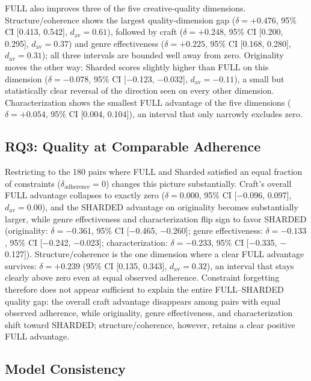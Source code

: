 FULL also improves three of the five creative-quality dimensions. Structure/coherence shows the largest quality-dimension gap ($\delta = +0.476$, 95\% CI [0.413, 0.542], $d_{\mathrm{av}} = 0.61$), followed by craft ($\delta = +0.248$, 95\% CI [0.200, 0.295], $d_{\mathrm{av}} = 0.37$) and genre effectiveness ($\delta = +0.225$, 95\% CI [0.168, 0.280], $d_{\mathrm{av}} = 0.31$); all three intervals are bounded well away from zero. Originality moves the other way: Sharded scores slightly higher than FULL on this dimension ($\delta = -0.078$, 95\% CI [$-$0.123, $-$0.032], $d_{\mathrm{av}} = -0.11$), a small but statistically clear reversal of the direction seen on every other dimension. Characterization shows the smallest FULL advantage of the five dimensions ($\delta = +0.054$, 95\% CI [0.004, 0.104]), an interval that only narrowly excludes zero.

\subsection{RQ3: Quality at Comparable Adherence}
\label{sec:rq3}

Restricting to the 180 pairs where FULL and Sharded satisfied an equal fraction of constraints ($\delta_{\text{adherence}} = 0$) changes this picture substantially. Craft's overall FULL advantage collapses to exactly zero ($\delta = 0.000$, 95\% CI [$-$0.096, 0.097], $d_{\mathrm{av}} = 0.00$), and the SHARDED advantage on originality becomes substantially larger, while genre effectiveness and characterization flip sign to favor SHARDED (originality: $\delta = -0.361$, 95\% CI [$-$0.465, $-$0.260]; genre effectiveness: $\delta = -0.133$, 95\% CI [$-$0.242, $-$0.023]; characterization: $\delta = -0.233$, 95\% CI [$-$0.335, $-$0.127]). Structure/coherence is the one dimension where a clear FULL advantage survives: $\delta = +0.239$ (95\% CI [0.135, 0.343], $d_{\mathrm{av}} = 0.32$), an interval that stays clearly above zero even at equal observed adherence. Constraint forgetting therefore does not appear sufficient to explain the entire FULL--SHARDED quality gap: the overall craft advantage disappears among pairs with equal observed adherence, while originality, genre effectiveness, and characterization shift toward SHARDED; structure/coherence, however, retains a clear positive FULL advantage.

\subsection{Model Consistency}
\label{sec:rq4}


